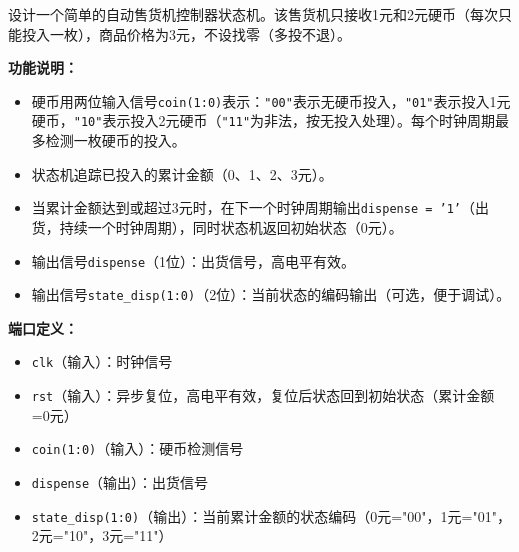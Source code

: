 设计一个简单的自动售货机控制器状态机。该售货机只接收1元和2元硬币（每次只能投入一枚），商品价格为3元，不设找零（多投不退）。

\vspace{0.3cm}

\textbf{功能说明：}
\begin{itemize}
  \item 硬币用两位输入信号\texttt{coin(1:0)}表示：\texttt{"00"}表示无硬币投入，\texttt{"01"}表示投入1元硬币，\texttt{"10"}表示投入2元硬币（\texttt{"11"}为非法，按无投入处理）。每个时钟周期最多检测一枚硬币的投入。
  \item 状态机追踪已投入的累计金额（0、1、2、3元）。
  \item 当累计金额达到或超过3元时，在下一个时钟周期输出\texttt{dispense = '1'}（出货，持续一个时钟周期），同时状态机返回初始状态（0元）。
  \item 输出信号\texttt{dispense}（1位）：出货信号，高电平有效。
  \item 输出信号\texttt{state\_disp(1:0)}（2位）：当前状态的编码输出（可选，便于调试）。
\end{itemize}

\vspace{0.3cm}

\textbf{端口定义：}
\begin{itemize}
  \item \texttt{clk}（输入）：时钟信号
  \item \texttt{rst}（输入）：异步复位，高电平有效，复位后状态回到初始状态（累计金额=0元）
  \item \texttt{coin(1:0)}（输入）：硬币检测信号
  \item \texttt{dispense}（输出）：出货信号
  \item \texttt{state\_disp(1:0)}（输出）：当前累计金额的状态编码（0元="00"，1元="01"，2元="10"，3元="11"）
\end{itemize}

\vspace{0.3cm}

